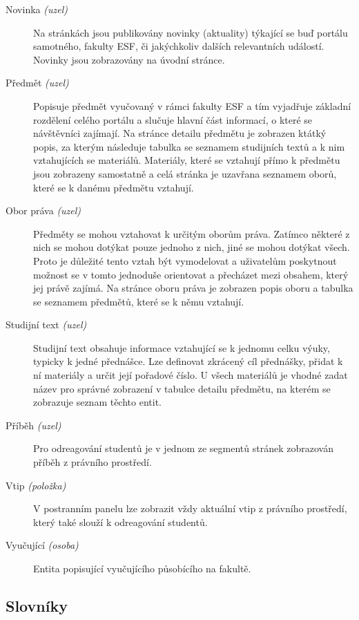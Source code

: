 \begin{description}
  \item[Novinka \emph{(uzel)}] Na stránkách jsou publikovány novinky (aktuality) týkající se buď portálu samotného, fakulty ESF, či jakýchkoliv dalších relevantních událostí. Novinky jsou zobrazovány na úvodní stránce. 
  
  \item[Předmět \emph{(uzel)}] Popisuje předmět vyučovaný v rámci fakulty ESF a tím vyjadřuje základní rozdělení celého portálu a slučuje hlavní část informací, o které se návštěvníci zajímají. Na stránce detailu předmětu je zobrazen ktátký popis, za kterým následuje tabulka se seznamem studijních textů a k nim vztahujících se materiálů. Materiály, které se vztahují přímo k předmětu jsou zobrazeny samostatně a celá stránka je uzavřana seznamem oborů, které se k danému předmětu vztahují.

  \item[Obor práva \emph{(uzel)}] Předměty se mohou vztahovat k určitým oborům práva. Zatímco některé z nich se mohou dotýkat pouze jednoho z nich, jiné se mohou dotýkat všech. Proto je důležité tento vztah být vymodelovat a uživatelům poskytnout možnost se v tomto jednoduše orientovat a přecházet mezi obsahem, který jej právě zajímá. Na stránce oboru práva je zobrazen popis oboru a tabulka se seznamem předmětů, které se k němu vztahují.

  \item[Studijní text \emph{(uzel)}] Studijní text obsahuje informace vztahující se k jednomu celku výuky, typicky k jedné přednášce. Lze definovat zkrácený cíl přednášky, přidat k ní materiály a určit její pořadové číslo. U všech materiálů je vhodné zadat název pro správné zobrazení v tabulce detailu předmětu, na kterém se zobrazuje seznam těchto entit.

  \item[Příběh \emph{(uzel)}] Pro odreagování studentů je v jednom ze segmentů stránek zobrazován příběh z právního prostředí. 

  \item[Vtip \emph{(položka)}] V postranním panelu lze zobrazit vždy aktuální vtip z právního prostředí, který také slouží k odreagování studentů. 

  \item[Vyučující \emph{(osoba)}] Entita popisující vyučujícího působícího na fakultě.
\end{description}

\subsection{Slovníky}

